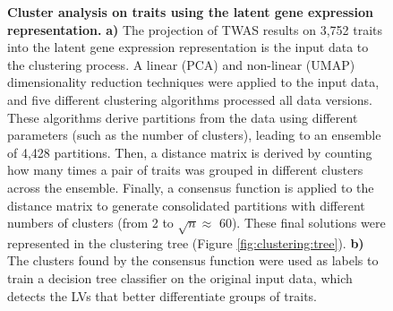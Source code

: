 \documentclass[
  a4paper,
]{article}
\begin{document}
\begin{figure}
\hypertarget{fig:clustering:design}{%
\centering

\caption{\textbf{Cluster analysis on traits using the latent gene expression representation.}
\textbf{a)} The projection of TWAS results on 3,752 traits into the latent gene expression representation is the input data to the clustering process.
A linear (PCA) and non-linear (UMAP) dimensionality reduction techniques were applied to the input data, and five different clustering algorithms processed all data versions.
These algorithms derive partitions from the data using different parameters (such as the number of clusters), leading to an ensemble of 4,428 partitions.
Then, a distance matrix is derived by counting how many times a pair of traits was grouped in different clusters across the ensemble.
Finally, a consensus function is applied to the distance matrix to generate consolidated partitions with different numbers of clusters (from 2 to \(\sqrt{n}\approx\) 60).
These final solutions were represented in the clustering tree (Figure \ref{fig:clustering:tree}).
\textbf{b)} The clusters found by the consensus function were used as labels to train a decision tree classifier on the original input data, which detects the LVs that better differentiate groups of traits.}\label{fig:clustering:design}
}
\end{figure}
\end{document}
